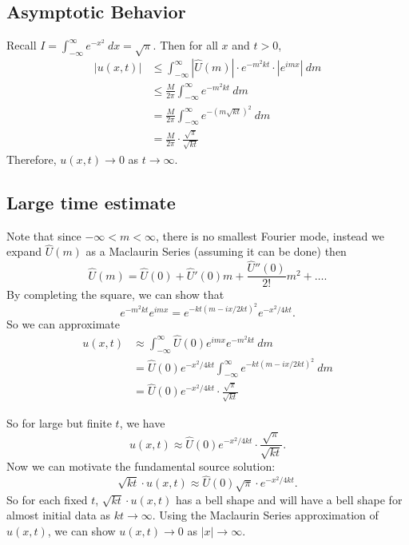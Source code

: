 \documentclass[class=article,crop=false]{standalone}
\begin{document}
\subsection{Asymptotic Behavior}

Recall $ I = \int_{-\infty}^{\infty} e^{-x^2} \ dx = \sqrt{\pi}  $. Then for all $ x$ and  $ t>0$,
 \begin{align*}
	 |u(x,t)|&\leq \int_{-\infty}^{\infty} | \hat{ U}(m)| \cdot e^{-m^2kt} \cdot  |e^{imx}|\ dm \\
		 &\leq \frac{M}{2\pi} \int_{-\infty}^{\infty} e^{-m^2kt} \ d m \\ 
		 &= \frac{M}{2\pi} \int_{-\infty}^{\infty} e^{-(m\sqrt{kt})^2 } \ d m \\
		 &= \frac{M}{2\pi} \cdot \frac{\sqrt{\pi} }{\sqrt{kt}  } 
\end{align*}
Therefore, $ u(x,t) \to 0$ as $ t \to \infty$.

\subsection{Large time estimate}

Note that since $-\infty<m< \infty $, there is no smallest Fourier mode, instead we expand $ \hat{ U}(m)$ as a Maclaurin Series (assuming it can be done) then
\[
	\hat{ U}(m) = \hat{ U}(0) + \hat{ U}'(0)m + \frac{\hat{ U}''(0)}{2! } m^2 + \ldots
.\]
By completing the square, we can show that
\[
	e^{-m^2kt} e^{imx} = e^{-kt(m-ix / 2kt)^2} e^{-x^2 /4kt}
.\] 
So we can approximate
\begin{align*}
	u(x,t) &\approx \int_{-\infty}^{\infty} \hat{ U}(0) e^{imx}e^{-m^2kt}\ d m \\
	       &= \hat{ U}(0) e^{-x^2 / 4kt} \int_{-\infty}^{\infty} e^{-kt(m-ix /2kt)^2} \ d m \\
	       &= \hat{ U}(0) e^{-x^2 / 4kt} \cdot \frac{\sqrt{\pi} }{\sqrt{kt}  }
\end{align*}

So for large but finite $ t$, we have
 \[
	 u(x,t) \approx \hat{ U}(0) e^{-x^2 / 4kt} \cdot \frac{\sqrt{\pi} }{\sqrt{kt}  }
.\]
Now we can motivate the fundamental source solution:
\[
	\sqrt{kt} \cdot u(x,t) \approx \hat{ U}(0) \sqrt{\pi} \cdot e^{-x^2 /4kt}  
.\]
So for each fixed $ t$,  $ \sqrt{kt} \cdot u(x,t)$ has a bell shape and will have a bell shape for almost initial data as $ kt \to \infty$. Using the Maclaurin Series approximation of $ u(x,t)$, we can show  $ u(x,t) \to 0$ as $ |x|\to \infty$.
\end{document}
